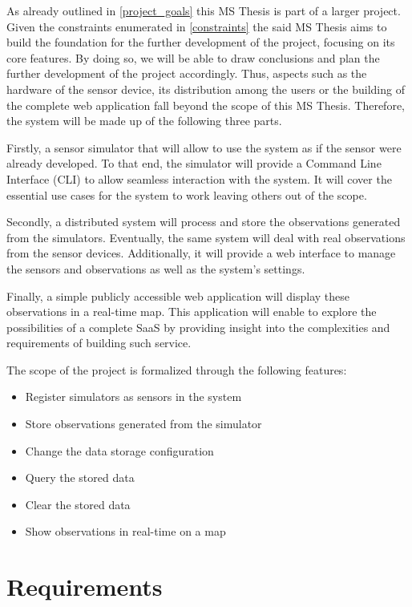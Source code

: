 As already outlined in \ref{project_goals} this MS Thesis is part of a larger project. Given the constraints enumerated in \ref{constraints} the said MS Thesis aims to build the foundation for the further development of the project, focusing on its core features. By doing so, we will be able to draw conclusions and plan the further development of the project accordingly. Thus, aspects such as the hardware of the sensor device, its distribution among the users or the building of the complete web application fall beyond the scope of this MS Thesis. Therefore, the system will be made up of the following three parts.

Firstly, a sensor simulator that will allow to use the system as if the sensor were already developed. To that end, the simulator will provide a Command Line Interface (CLI) to allow seamless interaction with the system. It will cover the essential use cases for the system to work leaving others out of the scope.

Secondly, a distributed system will process and store the observations generated from the simulators. Eventually, the same system will deal with real observations from the sensor devices. Additionally, it will provide a web interface to manage the sensors and observations as well as the system's settings.

Finally, a simple publicly accessible web application will display these observations in a real-time map. This application will enable to explore the possibilities of a complete SaaS by providing insight into the complexities and requirements of building such service.

The scope of the project is formalized through the following features:

\begin{itemize}
\item Register simulators as sensors in the system
\item Store observations generated from the simulator
\item Change the data storage configuration
\item Query the stored data
\item Clear the stored data
\item Show observations in real-time on a map
\end{itemize}

\section{Requirements}

